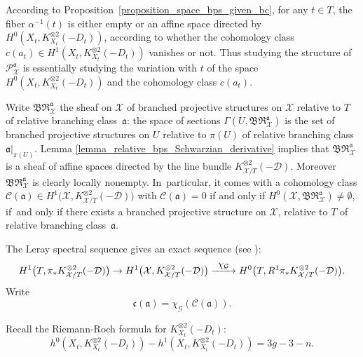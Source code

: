 \documentclass[JEP,XML,SOM,Unicode,NoEqCountersInSection,published]{cedram}
\newcommand\To[1]{\mathchoice{\xrightarrow{\textstyle\kern4pt#1\kern3pt}}{\stackrel{#1}{\longrightarrow}}{}{}}
\theoremstyle{definition}
\theoremstyle{plain}
\begin{document}
According to Proposition~\ref{proposition_space_bps_given_bc}, for any $t \in T$, the fiber $\alpha^{-1}(t)$ is either empty or an affine space directed by $H^0\left(X_t, K_{X_t}^{\otimes 2}(-D_t)\right)$, according to whether the cohomology class $c(a_t) \in H^1\left(X_t, K_{X_t}^{\otimes 2}(-D_t)\right)$ vanishes or not.
Thus studying the structure of $\mathcal P_{\mathcal X}^{\mathfrak a}$ is essentially studying the variation with $t$ of the space $H^0\left(X_t, K_{X_t}^{\otimes 2}(-D_t)\right)$ and the cohomology class $c(a_t)$.

Write $\mathfrak{BR}_{\mathcal X}^{\mathfrak a}$ the sheaf on $\mathcal X$ of branched projective structures on $\mathcal X$ relative to $T$ of relative branching class~$\mathfrak a$: the space of sections $\Gamma\left(U, \mathfrak{BR}_{\mathcal X}^{\mathfrak a}\right)$ is the set of branched projective structures on $U$ relative to $\pi(U)$ of relative branching class $\mathfrak a|_{\pi(U)}$.
Lemma \ref{lemma_relative_bps_Schwarzian_derivative} implies that $\mathfrak{BR}_{\mathcal X}^{\mathfrak a}$ is a sheaf of affine spaces directed by the line bundle $K_{\mathcal X/T}^{\otimes 2}(-\mathcal D)$.
Moreover $\mathfrak{BR}_{\mathcal X}^{\mathfrak a}$ is clearly locally nonempty. In~particular, it comes with a cohomology class $\mathcal C(\mathfrak a) \in H^1\bigl(\mathcal X, K_{\mathcal X/T}^{\otimes 2}(-\mathcal D)\bigr)$ with $\mathcal C(\mathfrak a) = 0$ if and only if $H^0(\mathcal X, \mathfrak{BR}_{\mathcal X}^{\mathfrak a}) \neq \emptyset$, \ie if~and only if there exists a branched projective structure on $\mathcal X$, relative to $T$ of relative branching class~$\mathfrak a$.

The Leray spectral sequence gives an exact sequence (see \cite{voisin_en_I}):\vspace*{-3pt}
\begin{equation}\label{eq_leray_exact_sequence}
H^1\bigl(T, \pi_*K_{\mathcal X/T}^{\otimes 2}(-\mathcal D)\bigr) \to H^1\bigl(\mathcal X, K_{\mathcal X/T}^{\otimes 2}(-\mathcal D)\bigr) \To{\chi_{\mathcal G}} H^0\bigl(T, R^1\pi_*K_{\mathcal X/T}^{\otimes 2}(-\mathcal D)\bigr).
\end{equation}
Write\vspace*{-3pt}
\begin{equation}\label{eq_section_obstruction}
\mathfrak c(\mathfrak a) = \chi_{\mathcal G}(\mathcal C(\mathfrak a)).
\end{equation}

Recall the Riemann-Roch formula for $K_{X_t}^{\otimes 2}(-D_t)$:\vspace*{-3pt}
\begin{equation*}
h^0\left(X_t, K_{X_t}^{\otimes 2}(-D_t)\right) - h^1\left(X_t, K_{X_t}^{\otimes 2}(-D_t)\right) = 3g-3-n.
\end{equation*}
\end{document}

